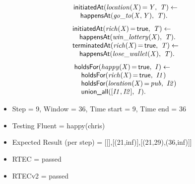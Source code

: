 \documentclass[8pt]{beamer}
\DeclareMathOperator{\val}{=}  %
\def \patsize {}
\def\happensAt{\textsf{\patsize happensAt}}
\def\holdsFor{\textsf{\patsize holdsFor}}
\def\initiatedAt{\textsf{\patsize initiatedAt}}
\def\terminatedAt{\textsf{\patsize terminatedAt}}
\def\unionall{\textsf{\patsize union\_all}}
\def\true{\textsf{\patsize true}}
\newenvironment{mysplit}%
  {\arraycolsep 0pt \begin{array}{l}}%
  {\end{array}}
\begin{document}
\begin{frame}
\begin{minipage}{0.48\linewidth}
        \begin{align*}
            \begin{mysplit}
                \initiatedAt\mathit{(location(X)\val Y,\ T) \leftarrow}\\
                \quad    \happensAt\mathit{(go\_to(X,Y),\ T).}
            \end{mysplit}
        \end{align*}
        \begin{align*}
            \begin{mysplit}
                \initiatedAt\mathit{(rich(X)\val\true,\ T) \leftarrow}\\
                \quad    \happensAt\mathit{(win\_lottery(X),\ T).}\\
                \terminatedAt\mathit{(rich(X)\val\true,\ T) \leftarrow}\\
                \quad    \happensAt\mathit{(lose\_wallet(X),\ T)}.\\
            \end{mysplit}
        \end{align*}
        \begin{align*}
            \begin{mysplit}
                \holdsFor\mathit{(happy(X)\val\true,\ I) \leftarrow}\\
                \quad    \holdsFor\mathit{(rich(X)\val\true,\ I1)}\\
                \quad    \holdsFor\mathit{(location(X)\val pub,\ I2)}\\
                \quad    \unionall\mathit{([I1,I2],\ I)}.
            \end{mysplit}
        \end{align*}
    \end{minipage}

    \begin{itemize}
        \item Step = 9, Window = 36, Time start = 9, Time end = 36
        \item Testing Fluent = happy(chris) 
        \item Expected Result (per step) = [[],[(21,inf)],[(21,29),(36,inf)]] 
        \item RTEC = passed
        \item RTECv2 = passed
    \end{itemize}
\end{frame}
\end{document}

